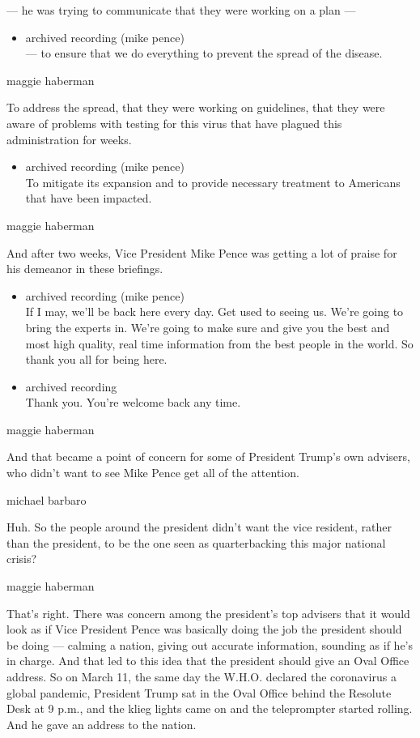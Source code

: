 --- he was trying to communicate that they were working on a plan ---

\begin{itemize}
\tightlist
\item
  archived recording (mike pence)\\
  --- to ensure that we do everything to prevent the spread of the
  disease.
\end{itemize}

maggie haberman

To address the spread, that they were working on guidelines, that they
were aware of problems with testing for this virus that have plagued
this administration for weeks.

\begin{itemize}
\tightlist
\item
  archived recording (mike pence)\\
  To mitigate its expansion and to provide necessary treatment to
  Americans that have been impacted.
\end{itemize}

maggie haberman

And after two weeks, Vice President Mike Pence was getting a lot of
praise for his demeanor in these briefings.

\begin{itemize}
\item
  archived recording (mike pence)\\
  If I may, we'll be back here every day. Get used to seeing us. We're
  going to bring the experts in. We're going to make sure and give you
  the best and most high quality, real time information from the best
  people in the world. So thank you all for being here.
\item
  archived recording\\
  Thank you. You're welcome back any time.
\end{itemize}

maggie haberman

And that became a point of concern for some of President Trump's own
advisers, who didn't want to see Mike Pence get all of the attention.

michael barbaro

Huh. So the people around the president didn't want the vice resident,
rather than the president, to be the one seen as quarterbacking this
major national crisis?

maggie haberman

That's right. There was concern among the president's top advisers that
it would look as if Vice President Pence was basically doing the job the
president should be doing --- calming a nation, giving out accurate
information, sounding as if he's in charge. And that led to this idea
that the president should give an Oval Office address. So on March 11,
the same day the W.H.O. declared the coronavirus a global pandemic,
President Trump sat in the Oval Office behind the Resolute Desk at 9
p.m., and the klieg lights came on and the teleprompter started rolling.
And he gave an address to the nation.

